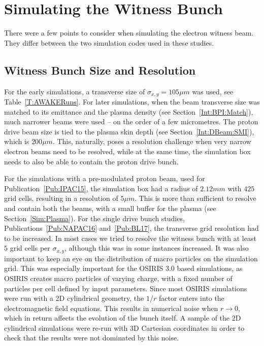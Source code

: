 
\section{Simulating the Witness Bunch}
\label{Sim:EBeam}

There were a few points to consider when simulating the electron witness beam.
They differ between the two simulation codes used in these studies.

\subsection{Witness Bunch Size and Resolution}
\label{Sim:EBeam:SizeRes}

For the early simulations, a transverse size of $\sigma_{x,y}=105\unit{\mu m}$ was used, see Table~\ref{T:AWAKERuns}.
For later simulations, when the beam transverse size was matched to its emittance and the plasma density (see Section~\ref{Int:BPI:Match}), much narrower beams were used -- on the order of a few micrometres.
The proton drive beam size is tied to the plasma skin depth (see Section~\ref{Int:DBeam:SMI}), which is $200\unit{\mu m}$.
This, naturally, poses a resolution challenge when very narrow electron beams need to be resolved, while at the same time, the simulation box needs to also be able to contain the proton drive bunch.

For the simulations with a pre-modulated proton beam, used for Publication~\ref{Pub:IPAC15}, the simulation box had a radius of $2.12\unit{mm}$ with $425$ grid cells, resulting in a resolution of $5\unit{\mu m}$.
This is more than sufficient to resolve and contain both the beams, with a small buffer for the plasma (see Section~\ref{Sim:Plasma}).
For the single drive bunch studies, Publications~\ref{Pub:NAPAC16} and~\ref{Pub:BL17}, the transverse grid resolution had to be increased.
In most cases we tried to resolve the witness bunch with at least $5$ grid cells per $\sigma_{x,y}$, although this was in some instances increased.
It was also important to keep an eye on the distribution of macro particles on the simulation grid.
This was especially important for the OSIRIS 3.0 based simulations, as OSIRIS creates macro particles of varying charge, with a fixed number of particles per cell defined by input parameters.
Since most OSIRIS simulations were run with a 2D cylindrical geometry, the $1/r$ factor enters into the electromagnetic field equations.
This results in numerical noise when $r \to 0$, which in return affects the evolution of the bunch itself.
A sample of the 2D cylindrical simulations were re-run with 3D Cartesian coordinates in order to check that the results were not dominated by this noise.

